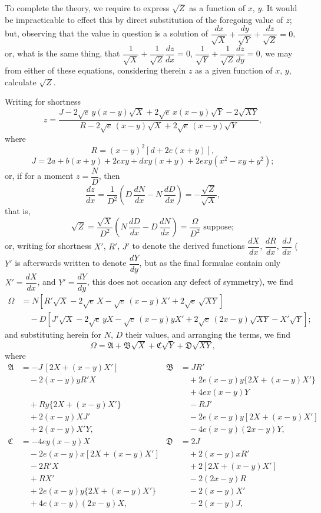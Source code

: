 \documentclass[11pt]{article}
\begin{document}
To complete the theory, we require to express $\sqrt{Z}$ as a function of $x$, $y$. It would be impracticable to effect this by direct substitution of the foregoing value of $z$; but, observing that the value in question is a solution of $\dfrac{dx}{\sqrt{X}} + \dfrac{dy}{\sqrt{Y}} + \dfrac{dz}{\sqrt{Z}} = 0$, or, what is the same thing, that $\dfrac{1}{\sqrt{X}} + \dfrac{1}{\sqrt{Z}}\dfrac{dz}{dx} = 0$, $\dfrac{1}{\sqrt{Y}} + \dfrac{1}{\sqrt{Z}}\dfrac{dz}{dy} = 0$, we may from either of these equations, considering therein $z$ as a given function of $x$, $y$, calculate $\sqrt{Z}$.

Writing for shortness
\[
z = \dfrac{J - 2\sqrt{e}\,y(x - y)\sqrt{X} + 2\sqrt{e}\,x(x - y)\sqrt{Y} - 2\sqrt{XY}}{R - 2\sqrt{e}\,(x - y)\sqrt{X} + 2\sqrt{e}\,(x - y)\sqrt{Y}},
\]
where
\[
R = (x - y)^2\!\left[d + 2e(x + y)\right],
\]
\[
J = 2a + b(x + y) + 2cxy + dxy(x + y) + 2exy(x^2 - xy + y^2);
\]
or, if for a moment $z = \dfrac{N}{D}$, then
\[
\dfrac{dz}{dx} = \dfrac{1}{D^2}\!\left(D\,\dfrac{dN}{dx} - N\,\dfrac{dD}{dx}\right) = -\dfrac{\sqrt{Z}}{\sqrt{X}},
\]
that is,
\[
\sqrt{Z} = \dfrac{\sqrt{X}}{D^2}\!\left(N\,\dfrac{dD}{dx} - D\,\dfrac{dN}{dx}\right) = \dfrac{\Omega}{D^2}\text{ suppose};
\]
or, writing for shortness $X'$, $R'$, $J'$ to denote the derived functions $\dfrac{dX}{dx}$, $\dfrac{dR}{dx}$, $\dfrac{dJ}{dx}$ ($Y'$ is afterwards written to denote $\dfrac{dY}{dy}$, but as the final formulae contain only $X' = \dfrac{dX}{dx}$, and $Y' = \dfrac{dY}{dy}$, this does not occasion any defect of symmetry), we find
\begin{align*}
\Omega &= N[R'\sqrt{X} - 2\sqrt{e}\,X - \sqrt{e}\,(x - y)X' + 2\sqrt{e}\,\sqrt{XY}]\\
&\quad - D[J'\sqrt{X} - 2\sqrt{e}\,yX - \sqrt{e}\,(x - y)yX' + 2\sqrt{e}\,(2x - y)\sqrt{XY} - X'\sqrt{Y}];
\end{align*}
and substituting herein for $N$, $D$ their values, and arranging the terms, we find
\[
\Omega = \mathfrak{A} + \mathfrak{B}\sqrt{X} + \mathfrak{C}\sqrt{Y} + \mathfrak{D}\sqrt{XY},
\]
where
\begin{align*}
\mathfrak{A} &= -J\,[2X + (x - y)X'] & \mathfrak{B} &= JR'\\
&\quad - 2(x - y)yR'X & &\quad + 2e(x - y)y\{2X + (x - y)X'\}\\
&\quad & &\quad + 4ex(x - y)Y\\
&\quad + Ry\{2X + (x - y)X'\} & &\quad - RJ'\\
&\quad + 2(x - y)XJ' & &\quad - 2e(x - y)y[2X + (x - y)X']\\
&\quad + 2(x - y)X'Y, & &\quad - 4e(x - y)(2x - y)Y,\\[2pt]
\mathfrak{C} &= -4ey(x - y)X & \mathfrak{D} &= 2J\\
&\quad - 2e(x - y)x[2X + (x - y)X'] & &\quad + 2(x - y)xR'\\
&\quad - 2R'X & &\quad + 2[2X + (x - y)X']\\
&\quad + RX' & &\quad - 2(2x - y)R\\
&\quad + 2e(x - y)y\{2X + (x - y)X'\} & &\quad - 2(x - y)X'\\
&\quad + 4e(x - y)(2x - y)X, & &\quad - 2(x - y)J,
\end{align*}
\end{document}
